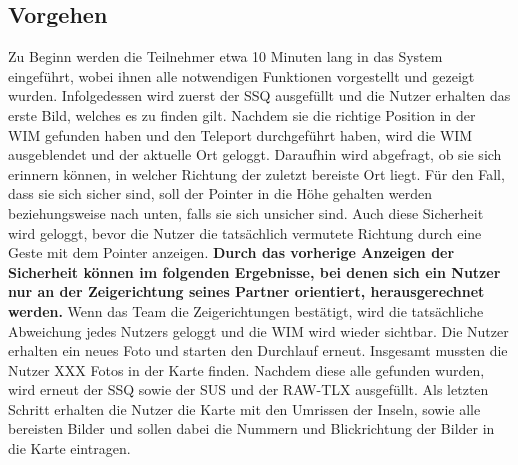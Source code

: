 \subsection{Vorgehen}
Zu Beginn werden die Teilnehmer etwa 10 Minuten lang in das System eingeführt, wobei ihnen alle notwendigen Funktionen vorgestellt und gezeigt wurden.
Infolgedessen wird zuerst der SSQ ausgefüllt und die Nutzer erhalten das erste Bild, welches es zu finden gilt. Nachdem sie die richtige Position in der WIM gefunden haben und den Teleport durchgeführt haben, wird die WIM ausgeblendet und der aktuelle Ort geloggt. Daraufhin wird abgefragt, ob sie sich erinnern können, in welcher Richtung der zuletzt bereiste Ort liegt. Für den Fall, dass sie sich sicher sind, soll der Pointer in die Höhe gehalten werden beziehungsweise nach unten, falls sie sich unsicher sind. Auch diese Sicherheit wird geloggt, bevor die Nutzer die tatsächlich vermutete Richtung durch eine Geste mit dem Pointer anzeigen. \textbf{Durch das vorherige Anzeigen der Sicherheit können im folgenden Ergebnisse, bei denen sich ein Nutzer nur an der Zeigerichtung seines Partner orientiert, herausgerechnet werden.}
Wenn das Team die Zeigerichtungen bestätigt, wird die tatsächliche Abweichung jedes Nutzers geloggt und die WIM wird wieder sichtbar. Die Nutzer erhalten ein neues Foto und starten den Durchlauf erneut.
Insgesamt mussten die Nutzer XXX Fotos in der Karte finden.
Nachdem diese alle gefunden wurden, wird erneut der SSQ sowie der SUS und der RAW-TLX ausgefüllt.
Als letzten Schritt erhalten die Nutzer die Karte mit den Umrissen der Inseln, sowie alle bereisten Bilder und sollen dabei die Nummern und Blickrichtung der Bilder in die Karte eintragen. 
